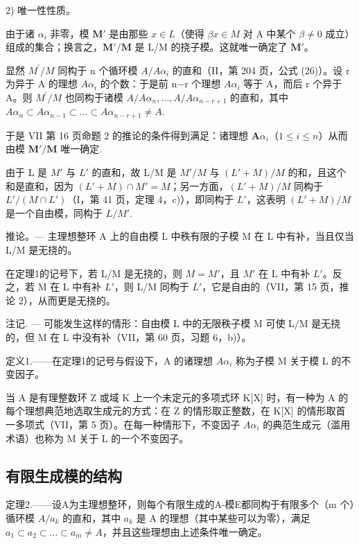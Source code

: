 2) 唯一性性质。

由于诸 \(\alpha_{i}\) 非零，模 \(\mathbf{M}'\) 是由那些 \(x\in L\)（使得 \(\beta x\in M\) 对 A 中某个 \(\beta \neq 0\) 成立）组成的集合；换言之，\(\mathbf{M}' / \mathbf{M}\) 是 L/M 的挠子模。这就唯一确定了 \(\mathbf{M}'\)。

显然 \(M^{\prime}/M\) 同构于 n 个循环模 \(A/A\alpha_{i}\) 的直和（II，第 204 页，公式 (26)）。设 r 为异于 A 的理想 \(A\alpha_{i}\) 的个数：于是前 n−r 个理想 \(A\alpha_{i}\) 等于 A，而后 r 个异于 A。则 \(M^{\prime}/M\) 也同构于诸模 \(A/A\alpha_{n}, \ldots, A/A\alpha_{n-r+1}\) 的直和，其中 \(A\alpha_{n} \subset A\alpha_{n-1} \subset \ldots \subset A\alpha_{n-r+1} \neq A\).

于是 VII 第 16 页命题 2 的推论的条件得到满足：诸理想 \(\mathbf{A}\alpha_{i}\)（\(1 \leqslant i \leqslant n\)）从而由模 \(\mathbf{M}'/\mathbf{M}\) 唯一确定.

由于 L 是 \(M'\) 与 \(L'\) 的直和，故 L/M 是 \(M'/M\) 与 \((L'+M)/M\) 的和，且这个和是直和，因为 \((L'+M) \cap M' = M\)；另一方面，\((L'+M)/M\) 同构于 \(L'/(M \cap L')\)（I，第 41 页，定理 4，c)），即同构于 \(L'\)，这表明 \((L'+M)/M\) 是一个自由模，同构于 \(L/M'\).

推论。--- 主理想整环 A 上的自由模 L 中秩有限的子模 M 在 L 中有补，当且仅当 L/M 是无挠的。

在定理1的记号下，若 L/M 是无挠的，则 \(M = M'\)，且 \(M'\) 在 L 中有补 \(L'\)。反之，若 M 在 L 中有补 \(L'\)，则 L/M 同构于 \(L'\)，它是自由的（VII，第 15 页，推论 2），从而更是无挠的。

注记. --- 可能发生这样的情形：自由模 L 中的无限秩子模 M 可使 L/M 是无挠的，但 M 在 L 中没有补（VII，第 60 页，习题 6，b)）。

定义1.——在定理1的记号与假设下，A 的诸理想 \(A\alpha_{i}\) 称为子模 M 关于模 L 的不变因子。

当 A 是有理整数环 Z 或域 K 上一个未定元的多项式环 K{[}X{]} 时，有一种为 A 的每个理想典范地选取生成元的方式：在 Z 的情形取正整数，在 K{[}X{]} 的情形取首一多项式（VII，第 5 页）。在每一种情形下，不变因子 \(A\alpha_{i}\) 的典范生成元（滥用术语）也称为 M 关于 L 的一个不变因子。

\subsection{有限生成模的结构}

定理2.——设A为主理想整环，则每个有限生成的A-模E都同构于有限多个（m 个）循环模 \(A/a_{k}\) 的直和，其中 \(a_{k}\) 是 A 的理想（其中某些可以为零），满足 \(a_{1} \subset a_{2} \subset \ldots \subset a_{m} \neq A\)，并且这些理想由上述条件唯一确定。

